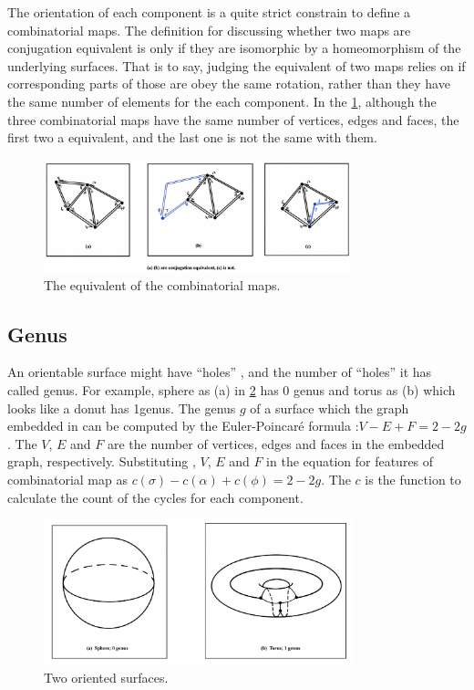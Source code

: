 The orientation of each component is a quite strict constrain to define a combinatorial maps. The definition for discussing whether two maps are conjugation equivalent is only if they are isomorphic by a homeomorphism of the underlying surfaces. That is to say, judging the equivalent of two maps relies on if corresponding parts of those are obey the same rotation, rather than they have the same number of elements for the each component. In the \cref{fig:figures:equivalent}, although the three combinatorial maps have the same number of vertices, edges and faces, the first two a equivalent, and the last one is not the same with them.

\begin{figure}[htb]
  \centering
  \includegraphics[width=0.8\textwidth]{../../image/equivalent.png}
  \caption{The equivalent of the combinatorial maps.}
  \label{fig:figures:equivalent}
\end{figure}

\subsection{Genus}
An orientable surface might have “holes” , and the number of “holes” it has called genus. For example, sphere as (a) in \cref{fig:figures:orsurfaces} has 0 genus and torus as (b) which looks like a donut has 1genus. The genus \(g\) of a surface which the graph embedded in can be computed by the Euler-Poincaré formula \cite{richeson2008euler}:\(V-E+F=2-2g\). The \(V\), \(E\) and \(F\) are the number of vertices, edges and faces in the embedded graph, respectively. Substituting , \(V\), \(E\) and \(F\) in the equation for features of combinatorial map as \(c(\sigma)-c(\alpha)+c(\phi)=2-2g\). The \(c\) is the function to calculate the count of the cycles for each component.

\begin{figure}[htb]
  \centering
  \includegraphics[width=0.8\textwidth]{../../image/oritation surface.png}
  \caption{Two oriented surfaces.}
  \label{fig:figures:orsurfaces}
\end{figure}

